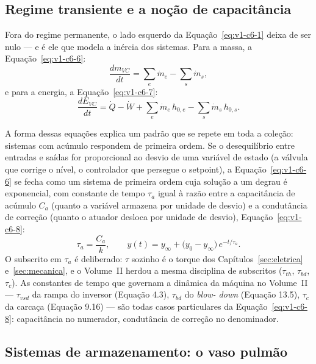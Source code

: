 \documentclass[12pt,a4paper]{article}
\numberwithin{equation}{section}
\numberwithin{table}{section}
\numberwithin{figure}{section}
\begin{document}
\subsection{Regime transiente e a noção de
capacitância}\label{sub:v1-c6-transiente}

Fora do regime permanente, o lado esquerdo da
Equação~\eqref{eq:v1-c6-1} deixa de ser nulo --- e é ele que modela a
inércia dos sistemas. Para a massa, a Equação~\eqref{eq:v1-c6-6}:
\begin{equation}\label{eq:v1-c6-6}
\frac{dm_{VC}}{dt} = \sum_e \dot{m}_e - \sum_s \dot{m}_s ,
\end{equation}
e para a energia, a Equação~\eqref{eq:v1-c6-7}:
\begin{equation}\label{eq:v1-c6-7}
\frac{dE_{VC}}{dt} = \dot{Q} - \dot{W} + \sum_e \dot{m}_e\,h_{0,e} -
\sum_s \dot{m}_s\,h_{0,s} .
\end{equation}

A forma dessas equações explica um padrão que se repete em toda a coleção:
sistemas com acúmulo respondem de primeira ordem. Se o desequilíbrio entre
entradas e saídas for proporcional ao desvio de uma variável de estado (a
válvula que corrige o nível, o controlador que persegue o setpoint), a
Equação~\eqref{eq:v1-c6-6} se fecha como um sistema de primeira ordem cuja
solução a um degrau é exponencial, com constante de tempo $\tau_a$ igual à
razão entre a capacitância de acúmulo $C_a$ (quanto a variável armazena por
unidade de desvio) e a condutância de correção (quanto o atuador desloca por
unidade de desvio), Equação~\eqref{eq:v1-c6-8}:
\begin{equation}\label{eq:v1-c6-8}
\tau_a = \frac{C_a}{k},
\qquad
y(t) = y_\infty + \bigl(y_0 - y_\infty\bigr)\,e^{-t/\tau_a}.
\end{equation}
O subscrito em $\tau_a$ é deliberado: $\tau$ sozinho é o torque dos
Capítulos~\ref{sec:eletrica} e~\ref{sec:mecanica}, e o Volume~II herdou a
mesma disciplina de subscritos ($\tau_{th}$, $\tau_{bd}$, $\tau_c$). As
constantes de tempo que governam a dinâmica da máquina no Volume~II ---
$\tau_{vsd}$ da rampa do inversor (Equação 4.3), $\tau_{bd}$ do \textit{blow-
down} (Equação 13.5), $\tau_c$ da carcaça (Equação 9.16) --- são todas casos
particulares da Equação~\eqref{eq:v1-c6-8}: capacitância no numerador,
condutância de correção no denominador.

\subsection{Sistemas de armazenamento: o vaso
pulmão}\label{sub:v1-c6-vaso}
\end{document}
